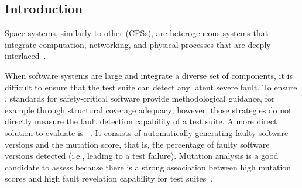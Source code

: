 \subsection{Introduction}

Space systems, similarly to other  (CPSs), are heterogeneous systems that integrate computation, networking, and physical processes that are deeply interlaced~\cite{Khaitan:2015}. 
 
 When software systems are large and integrate a diverse set of components, it is difficult to ensure that the test suite can detect any latent severe fault. To ensure , standards for safety-critical software provide methodological guidance, for example through structural coverage adequacy; however, those strategies do not directly measure the fault detection capability of a test suite. A more direct solution to evaluate  is ~\cite{jia2010analysis,papadakis2019mutation}. It consists of automatically generating faulty software versions and %
  the mutation score, that is, the percentage of faulty software versions detected (i.e., leading to a test failure).
 Mutation analysis is a good candidate to assess  because there is a strong association between high mutation scores and high fault revelation capability for test suites~\cite{papadakis2018mutation}. 

